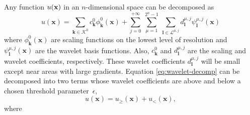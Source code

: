 Any function  $u({\bf x})$ in an $n$-dimensional space can be decomposed as \cite{chui:1997,daubechies:1992,mallat:1998}
\begin{equation}
u({\mathbf x})=\sum_{{\mathbf k} \in {\mathcal{K}}^0} c_{\mathbf k}^{0}
\phi_{\mathbf k}^{0}({\mathbf x}) + \sum_{j=0}^{+\infty} \
\sum_{\mu=1}^{2^{n}-1}\ \sum_{{\mathbf l} \in {\mathcal{L}}^{\mu,
j}} d_{\mathbf l}^{\mu, j} \psi_{\mathbf l}^{\mu, j}({\mathbf x})
\label{eq:wavelet-decomp}
\end{equation}
%
where $\phi_{\mathbf k}^{0}(\mathbf x)$ are scaling functions on the lowest level of resolution and $\psi_{\mathbf l}^{\mu, j}({\mathbf x})$ are the wavelet basis functions. Also, $c_{\mathbf k}^{0}$ and $d_{\mathbf l}^{\mu, j}$ are the scaling and wavelet coefficients, respectively. These wavelet coefficients $d_{\mathbf l}^{\mu, j}$ will be small except near areas with large gradients.  Equation \ref{eq:wavelet-decomp} can be decomposed into two terms whose wavelet coefficients are above and below a chosen threshold \mbox{parameter $\epsilon$,}
%
\begin{equation}
u({\mathbf x})=u_{\ge}({\mathbf x}) + u_{<}({\mathbf x}),
\label{eq:wavelet-split}
\end{equation}
%
where
%
